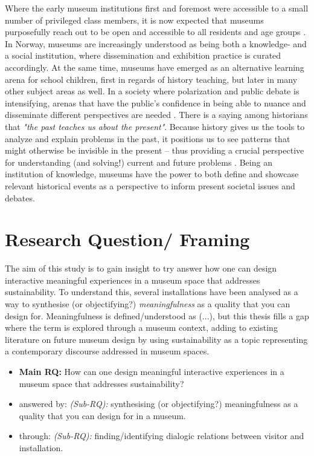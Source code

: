 Where the early museum institutions first and foremost were accessible to a small number of privileged class members, it is now expected that museums purposefully reach out to be open and accessible to all residents and age groups \autocite[p. 14]{melding23}. In Norway, museums are increasingly understood as being both a knowledge- and a social institution, where dissemination and exhibition practice is curated accordingly. At the same time, museums have emerged as an alternative learning arena for school children, first in regards of history teaching, but later in many other subject areas as well. In a society where polarization and public debate is intensifying, arenas that have the public's confidence in being able to nuance and disseminate different perspectives are needed \autocite[p. 7]{melding23}. There is a saying among historians that \emph{"the past teaches us about the present"}. Because history gives us the tools to analyze and explain problems in the past, it positions us to see patterns that might otherwise be invisible in the present – thus providing a crucial perspective for understanding (and solving!) current and future problems \autocite{UW_website}. Being an institution of knowledge, museums have the power to both define and showcase relevant historical events as a perspective to inform present societal issues and debates. 



\section{Research Question/ Framing}
The aim of this study is to gain insight to try answer how one can design interactive meaningful experiences in a museum space that addresses sustainability. To understand this, several installations have been analysed as a way to synthesise (or objectifying?) \emph{meaningfulness} as a quality that you can design for. Meaningfulness is defined/understood as (...), but this thesis fills a gap where the term is explored through a museum context, adding to existing literature on future museum design by using sustainability as a topic representing a contemporary discourse addressed in museum spaces.

\begin{itemize}
    \item \textbf{Main RQ:} How can one design meaningful interactive experiences in a museum space that addresses sustainability?
    \item answered by: \emph{(Sub-RQ):} synthesising (or objectifying?) meaningfulness as a quality that you can design for in a museum.
    \item through: \emph{(Sub-RQ):} finding/identifying dialogic relations between visitor and installation.
\end{itemize}



